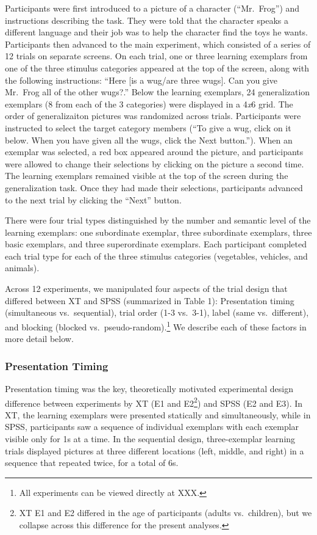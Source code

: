 \documentclass[english,floatsintext,man]{apa6}
\theoremstyle{definition}
\theoremstyle{definition}
\theoremstyle{remark}
\begin{document}
Participants were first introduced to a picture of a character
(\enquote{Mr.~Frog}) and instructions describing the task. They were
told that the character speaks a different language and their job was to
help the character find the toys he wants. Participants then advanced to
the main experiment, which consisted of a series of 12 trials on
separate screens. On each trial, one or three learning exemplars from
one of the three stimulus categories appeared at the top of the screen,
along with the following instructions: \enquote{Here {[}is a wug/are
three wugs{]}. Can you give Mr.~Frog all of the other wugs?.} Below the
learning exemplars, 24 generalization exemplars (8 from each of the 3
categories) were displayed in a 4\emph{x}6 grid. The order of
generalizaiton pictures was randomized across trials. Participants were
instructed to select the target category members (\enquote{To give a
wug, click on it below. When you have given all the wugs, click the Next
button.}). When an exemplar was selected, a red box appeared around the
picture, and participants were allowed to change their selections by
clicking on the picture a second time. The learning exemplars remained
visible at the top of the screen during the generalization task. Once
they had made their selections, participants advanced to the next trial
by clicking the \enquote{Next} button.

There were four trial types distinguished by the number and semantic
level of the learning exemplars: one subordinate exemplar, three
subordinate exemplars, three basic exemplars, and three superordinate
exemplars. Each participant completed each trial type for each of the
three stimulus categories (vegetables, vehicles, and animals).

Across 12 experiments, we manipulated four aspects of the trial design
that differed between XT and SPSS (summarized in Table 1): Presentation
timing (simultaneous vs.~sequential), trial order (1-3 vs.~3-1), label
(same vs.~different), and blocking (blocked
vs.~pseudo-random).\footnote{All experiments can be viewed directly at XXX.}
We describe each of these factors in more detail below.

\subsubsection{Presentation Timing}\label{presentation-timing}

Presentation timing was the key, theoretically motivated experimental
design difference between experiments by XT (E1 and E2\footnote{XT E1
  and E2 differed in the age of participants (adults vs.~children), but
  we collapse across this difference for the present analyses.}) and
SPSS (E2 and E3). In XT, the learning exemplars were presented
statically and simultaneously, while in SPSS, participants saw a
sequence of individual exemplars with each exemplar visible only for 1s
at a time. In the sequential design, three-exemplar learning trials
displayed pictures at three different locations (left, middle, and
right) in a sequence that repeated twice, for a total of 6s.
\end{document}
